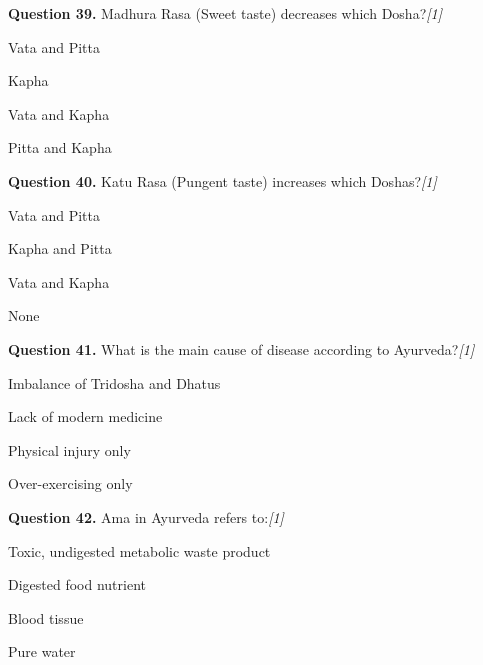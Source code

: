 \documentclass[11pt,a4paper]{article}
\newcommand{\pts}[1]{\hfill   \textit{[#1]}}
\begin{document}
\medskip




\noindent   \textbf{Question 39.} Madhura Rasa (Sweet taste) decreases which Dosha?\pts{1}

\begin{parts}
  \item Vata and Pitta
  \item Kapha
  \item Vata and Kapha
  \item Pitta and Kapha
\end{parts}

\medskip




\noindent   \textbf{Question 40.} Katu Rasa (Pungent taste) increases which Doshas?\pts{1}

\begin{parts}
  \item Vata and Pitta
  \item Kapha and Pitta
  \item Vata and Kapha
  \item None
\end{parts}

\medskip




\noindent   \textbf{Question 41.} What is the main cause of disease according to Ayurveda?\pts{1}

\begin{parts}
  \item Imbalance of Tridosha and Dhatus
  \item Lack of modern medicine
  \item Physical injury only
  \item Over-exercising only
\end{parts}

\medskip




\noindent   \textbf{Question 42.} Ama in Ayurveda refers to:\pts{1}

\begin{parts}
  \item Toxic, undigested metabolic waste product
  \item Digested food nutrient
  \item Blood tissue
  \item Pure water
\end{parts}

\medskip
\end{document}

